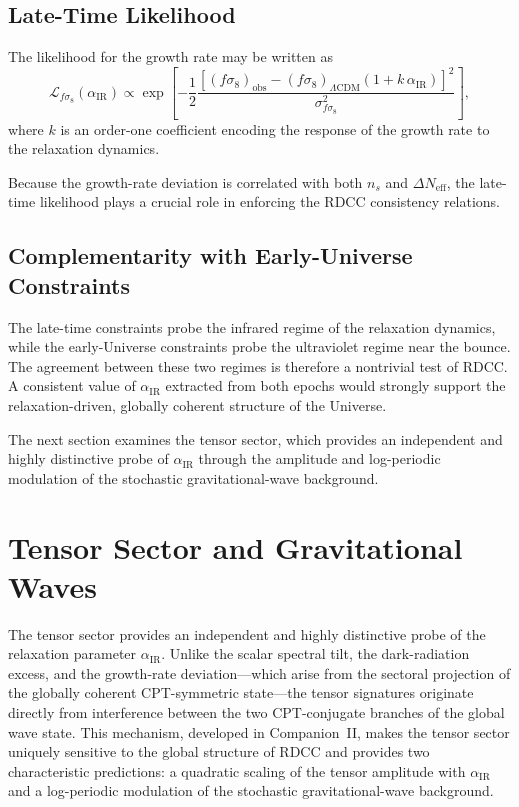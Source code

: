 \documentclass[11pt,a4paper]{article}
\begin{document}
\subsection{Late-Time Likelihood}

The likelihood for the growth rate may be written as
\begin{equation}
    \mathcal{L}_{f\sigma_8}(\alpha_{\mathrm{IR}}) \propto
    \exp\!\left[
        -\frac{1}{2}
        \frac{
            \left[
                (f\sigma_8)_{\mathrm{obs}}
                - (f\sigma_8)_{\Lambda\mathrm{CDM}}
                  \left(1 + k\,\alpha_{\mathrm{IR}}\right)
            \right]^2
        }{
            \sigma_{f\sigma_8}^2
        }
    \right],
\end{equation}
where $k$ is an order-one coefficient encoding the response of the growth rate to the relaxation
dynamics.

Because the growth-rate deviation is correlated with both $n_s$ and $\Delta N_{\mathrm{eff}}$, the
late-time likelihood plays a crucial role in enforcing the RDCC consistency relations.

\subsection{Complementarity with Early-Universe Constraints}

The late-time constraints probe the infrared regime of the relaxation dynamics, while the
early-Universe constraints probe the ultraviolet regime near the bounce. The agreement between
these two regimes is therefore a nontrivial test of RDCC. A consistent value of $\alpha_{\mathrm{IR}}$
extracted from both epochs would strongly support the relaxation-driven, globally coherent
structure of the Universe.

The next section examines the tensor sector, which provides an independent and highly
distinctive probe of $\alpha_{\mathrm{IR}}$ through the amplitude and log-periodic modulation of the
stochastic gravitational-wave background.

\section{Tensor Sector and Gravitational Waves}

The tensor sector provides an independent and highly distinctive probe of the relaxation
parameter $\alpha_{\mathrm{IR}}$. Unlike the scalar spectral tilt, the dark-radiation excess, and the
growth-rate deviation—which arise from the sectoral projection of the globally coherent
CPT-symmetric state—the tensor signatures originate directly from interference between the two
CPT-conjugate branches of the global wave state. This mechanism, developed in Companion~II,
makes the tensor sector uniquely sensitive to the global structure of RDCC and provides two
characteristic predictions: a quadratic scaling of the tensor amplitude with $\alpha_{\mathrm{IR}}$ and a
log-periodic modulation of the stochastic gravitational-wave background.
\end{document}
